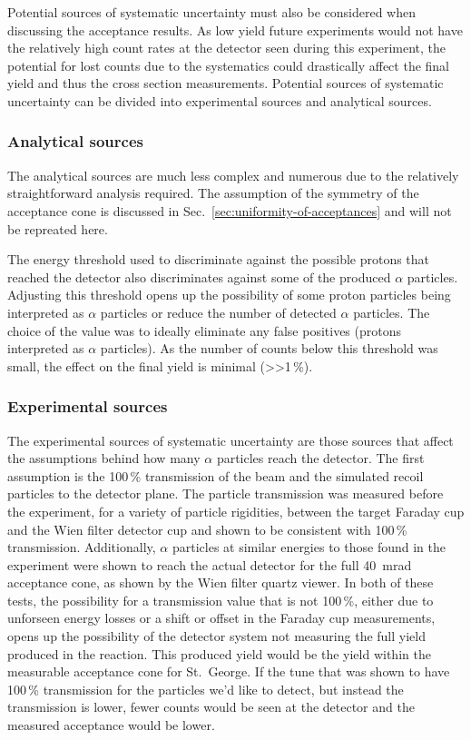 Potential sources of systematic uncertainty must also be considered when
discussing the acceptance results. As low yield future experiments would
not have the relatively high count rates at the detector seen during
this experiment, the potential for lost counts due to the systematics
could drastically affect the final yield and thus the cross section
measurements. Potential sources of systematic uncertainty can be divided
into experimental sources and analytical sources.

\subsubsection{Analytical sources}
The analytical sources are much less complex and numerous due to the
relatively straightforward analysis required. The assumption of the
symmetry of the acceptance cone is discussed in
Sec.~\ref{sec:uniformity-of-acceptances} and will not be repreated here.

The energy threshold used to discriminate against the possible protons
that reached the detector also discriminates against some of the
produced $\alpha$ particles. Adjusting this threshold opens up the
possibility of some proton particles being interpreted as $\alpha$
particles or reduce the number of detected $\alpha$ particles. The
choice of the value was to ideally eliminate any false positives
(protons interpreted as $\alpha$ particles). As the number of counts
below this threshold was small, the effect on the final yield is
minimal (>>1\,\%).

\subsubsection{Experimental sources}
The experimental sources of systematic uncertainty are those sources
that affect the assumptions behind how many $\alpha$ particles reach the
detector. The first assumption is the 100\,\% transmission of the beam
and the simulated recoil particles to the detector plane. The particle
transmission was measured before the experiment, for a variety of
particle rigidities, between the target Faraday cup and the Wien filter
detector cup and shown to be consistent with 100\,\% transmission.
Additionally, $\alpha$ particles at similar energies to those found in
the experiment were shown to reach the actual detector for the full
40~mrad acceptance cone, as shown by the Wien filter quartz viewer. In
both of these tests, the possibility for a transmission value that is
not 100\,\%, either due to unforseen energy losses or a shift or offset
in the Faraday cup measurements, opens up the possibility of the
detector system not measuring the full yield produced in the reaction.
This produced yield would be the yield within the measurable acceptance
cone for St.\ George. If the tune that was shown to have 100\,\%
transmission for the particles we'd like to detect, but instead the
transmission is lower, fewer counts would be seen at the detector and
the measured acceptance would be lower.


